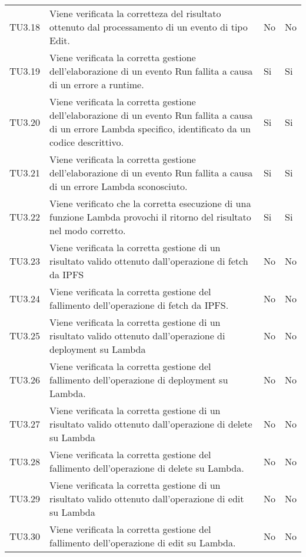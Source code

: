 \begin{longtable}{
		>{\centering}p{}
		>{}p{}
		>{\centering}p{}
		>{\centering}p{} }
	TU3.18 & Viene verificata la corretteza del risultato ottenuto dal processamento di un evento di tipo Edit. & No & No \tabularnewline
	TU3.19 & Viene verificata la corretta gestione dell'elaborazione di un evento Run fallita a causa di un errore a runtime. & Si & Si \tabularnewline
	TU3.20 & Viene verificata la corretta gestione dell'elaborazione di un evento Run fallita a causa di un errore Lambda specifico, identificato da un codice descrittivo. & Si & Si \tabularnewline
	TU3.21 & Viene verificata la corretta gestione dell'elaborazione di un evento Run fallita a causa di un errore Lambda sconosciuto. & Si & Si \tabularnewline
	TU3.22 & Viene verificato che la corretta esecuzione di una funzione Lambda provochi il ritorno del risultato nel modo corretto. & Si & Si \tabularnewline
	TU3.23 & Viene verificata la corretta gestione di un risultato valido ottenuto dall'operazione di fetch da IPFS & No & No \tabularnewline
	TU3.24 & Viene verificata la corretta gestione del fallimento dell'operazione di fetch da IPFS. & No & No \tabularnewline
	TU3.25 & Viene verificata la corretta gestione di un risultato valido ottenuto dall'operazione di deployment su Lambda & No & No \tabularnewline
	TU3.26 & Viene verificata la corretta gestione del fallimento dell'operazione di deployment su Lambda. & No & No \tabularnewline
	TU3.27 & Viene verificata la corretta gestione di un risultato valido ottenuto dall'operazione di delete su Lambda & No & No \tabularnewline
	TU3.28 & Viene verificata la corretta gestione del fallimento dell'operazione di delete su Lambda. & No & No \tabularnewline
	TU3.29 & Viene verificata la corretta gestione di un risultato valido ottenuto dall'operazione di edit su Lambda & No & No \tabularnewline
	TU3.30 & Viene verificata la corretta gestione del fallimento dell'operazione di edit su Lambda. & No & No \tabularnewline
\end{longtable}
